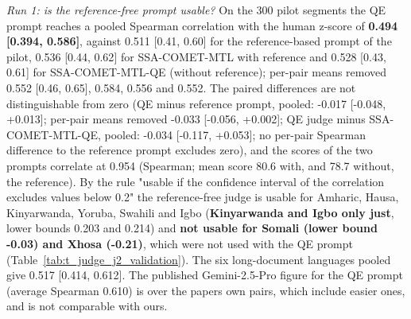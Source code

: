 \emph{Run 1: is the reference-free prompt usable?} On the 300 pilot segments the QE prompt reaches a pooled Spearman correlation with the human z-score of \textbf{0.494 {[}0.394, 0.586{]}}, against 0.511 {[}0.41, 0.60{]} for the reference-based prompt of the pilot, 0.536 {[}0.44, 0.62{]} for SSA-COMET-MTL with reference and 0.528 {[}0.43, 0.61{]} for SSA-COMET-MTL-QE (without reference); per-pair means removed 0.552 {[}0.46, 0.65{]}, 0.584, 0.556 and 0.552. The paired differences are not distinguishable from zero (QE minus reference prompt, pooled: -0.017 {[}-0.048, +0.013{]}; per-pair means removed -0.033 {[}-0.056, +0.002{]}; QE judge minus SSA-COMET-MTL-QE, pooled: -0.034 {[}-0.117, +0.053{]}; no per-pair Spearman difference to the reference prompt excludes zero), and the scores of the two prompts correlate at 0.954 (Spearman; mean score 80.6 with, and 78.7 without, the reference). By the rule "usable if the confidence interval of the correlation excludes values below 0.2" the reference-free judge is usable for Amharic, Hausa, Kinyarwanda, Yoruba, Swahili and Igbo (\textbf{Kinyarwanda and Igbo only just}, lower bounds 0.203 and 0.214) and \textbf{not usable for Somali (lower bound -0.03) and Xhosa (-0.21)}, which were not used with the QE prompt (Table~\ref{tab:t_judge_j2_validation}). The six long-document languages pooled give 0.517 {[}0.414, 0.612{]}. The published Gemini-2.5-Pro figure for the QE prompt (average Spearman 0.610) is over the paper\textquotesingle s own pairs, which include easier ones, and is not comparable with ours.

